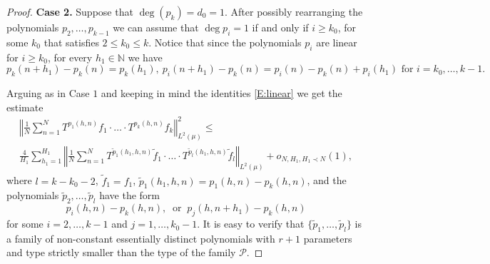 \documentclass[11pt]{amsart}
\newcommand{\N}{\mathbb{N}}
\newcommand{\norm}[1]{\left\Vert #1\right\Vert}
\theoremstyle{plain}
\theoremstyle{definition}
\theoremstyle{remark}
\begin{document}
\begin{proof}
{\bf Case 2.} Suppose that $\deg(p_k)=d_0=1$.  After possibly
rearranging the polynomials $p_2,\ldots, p_{k-1}$ we can assume that
$\deg{p_i}=1$ if and only if $i\geq k_0$, for some $k_0$ that
satisfies $2\leq k_0\leq k$.  Notice that since the polynomials $p_i$
are linear for $i\geq k_0$, for every $h_1\in\N$ we have
\begin{equation}\label{E:linear}
  p_k(n+h_{1})-p_k(n)=p_k(h_1), \ p_i(n+h_{1})-p_k(n)=p_i(n)-p_k(n)+p_i(h_1)
  \text{ for } i=k_0,\ldots,k-1.
\end{equation}

Arguing as in Case $1$ and keeping in mind the identities
\eqref{E:linear} we get the estimate
\begin{multline}\label{E:bvc}
  \norm{\frac{1}{N}\sum_{n=1}^N T^{p_1(h,n)}f_1\cdot \ldots\cdot
    T^{p_k(h,n)}f_k}_{L^2(\mu)}^2\leq\\ \frac{4}{H_1}
    \sum_{h_1=1}^{H_1}\norm{\frac{1}{N}\sum_{n=1}^N T^{\tilde{p}_1(h_1,h,n)}\tilde{f}_1\cdot \ldots\cdot
    T^{\tilde{p}_{l}(h_1,h,n)}\tilde{f}_{l}}_{L^2(\mu)} +o_{N,H_1, H_1\prec N}(1),
\end{multline}
where  $l=k-k_0-2$, $\tilde{f}_1=f_1$,
$\tilde{p}_1(h_{1},h,n)= p_1(h,n)-p_k(h,n)$, and the polynomials $\tilde{p}_2,\ldots,\tilde{p}_l$
have the form
$$
p_i(h,n)-p_k(h,n), \ \text{ or } \ p_j(h,n+h_{1})-p_k(h,n)
$$
for some $i=2,\ldots,k-1$ and $j=1,\ldots,k_0-1$.  It is easy to verify that
 $\{\tilde{p}_1,\ldots,\tilde{p}_{l}\}$ is a family of
non-constant essentially distinct polynomials with  $r+1$ parameters  and type
strictly  smaller than the type of the family $\mathcal{P}$.


\end{proof}
\end{document}
